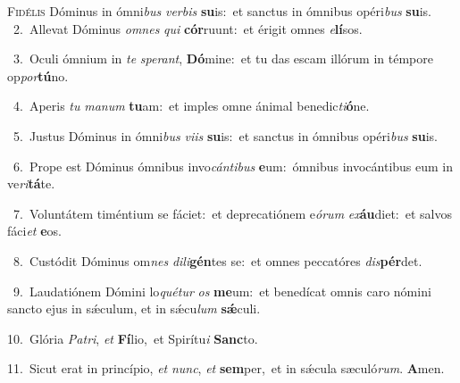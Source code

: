 \lettrine{\initial\textcolor{\initialcolor}{F}}{idélis} Dóminus in ómni\textit{bus} \textit{ver}\-\textit{bis} \textbf{su}\-is:~\star et sanctus in ómnibus opéri\textit{bus} \textbf{su}\-is.\\
{\numbfont\textcolor{\numbcolor}{~2.}}~Allevat Dóminus \textit{om}\-\textit{nes} \textit{qui} \textbf{cór}\-ruunt:~\star et érigit omnes \textit{e}\-\textbf{lí}sos.\par
{\numbfont\textcolor{\numbcolor}{~3.}}~Oculi ómnium in \textit{te} \textit{spe}\-\textit{rant}, \textbf{Dó}\-mine:~\star et tu das escam illórum in témpore op\-\textit{por}\-\textbf{tú}no.\par
{\numbfont\textcolor{\numbcolor}{~4.}}~Aperis \textit{tu} \textit{ma}\-\textit{num} \textbf{tu}\-am:~\star et imples omne ánimal benedic\-\textit{ti}\-\textbf{ó}ne.\par
{\numbfont\textcolor{\numbcolor}{~5.}}~Justus Dóminus in ómni\textit{bus} \textit{vi}\-\textit{is} \textbf{su}\-is:~\star et sanctus in ómnibus opéri\textit{bus} \textbf{su}\-is.\par
{\numbfont\textcolor{\numbcolor}{~6.}}~Prope est Dóminus ómnibus invo\-\textit{cán}\-\textit{ti}\textit{bus} \textbf{e}\-um:~\star ómnibus invocántibus eum in ve\-\textit{ri}\-\textbf{tá}te.\par
{\numbfont\textcolor{\numbcolor}{~7.}}~Voluntátem timéntium se fáciet:~\dagger et deprecatiónem e\-\textit{ó}\-\textit{rum} \textit{ex}\-\textbf{áu}diet:~\star et salvos fáci\textit{et} \textbf{e}\-os.\par
{\numbfont\textcolor{\numbcolor}{~8.}}~Custódit Dóminus om\textit{nes} \textit{di}\-\textit{li}\textbf{gén}tes se:~\star et omnes peccatóres \textit{dis}\-\textbf{pér}det.\par
{\numbfont\textcolor{\numbcolor}{~9.}}~Laudatiónem Dómini lo\-\textit{qué}\-\textit{tur} \textit{os} \textbf{me}\-um:~\star et benedícat omnis caro nómini sancto ejus in sǽculum, et in sǽcu\textit{lum} \textbf{sǽ}\-culi.\par
{\numbfont\textcolor{\numbcolor}{10.}}~Glória \textit{Pa}\-\textit{tri}, \textit{et} \textbf{Fí}\-lio,~\star et Spirítu\textit{i} \textbf{Sanc}\-to.\par
{\numbfont\textcolor{\numbcolor}{11.}}~Sicut erat in princípio, \textit{et} \textit{nunc}\-, \textit{et} \textbf{sem}\-per,~\star et in sǽcula sæculó\-\textit{rum}\-. \textbf{A}\-men.\par
